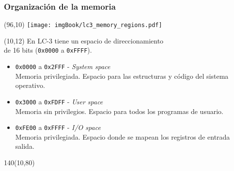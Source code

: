 \documentclass[aspectratio=169]{beamer}
\begin{document}
\begin{frame}[t,fragile]
    \frametitle{Organización de la memoria}
    \begin{textblock}{65}(96,10) \texttt{[image: imgBook/lc3\_memory\_regions.pdf]} \end{textblock}
    \begin{textblock}{80}(10,12)
    En LC-3 tiene un espacio de direccionamiento\\ de 16 bits (\texttt{0x0000} a \texttt{0xFFFF}).\\
    \bigskip
    \begin{itemize}
     \item<2-> \textcolor{naranjauca}{\texttt{0x0000} a \texttt{0x2FFF}} - \emph{System space}\\
     Memoria privilegiada. Espacio para las estructuras y código del sistema operativo.
     \item<3-> \textcolor{naranjauca}{\texttt{0x3000} a \texttt{0xFDFF}} - \emph{User space}\\
     Memoria sin privilegios. Espacio para todos los programas de usuario.
     \item<4-> \textcolor{naranjauca}{\texttt{0xFE00} a \texttt{0xFFFF}} - \emph{I/O space}\\
     Memoria privilegiada. Espacio donde se mapean los registros de entrada salida.
    \end{itemize}
    \end{textblock}
    \begin{textblock}{140}(10,80)
    \end{textblock}
\end{frame}
\end{document}
